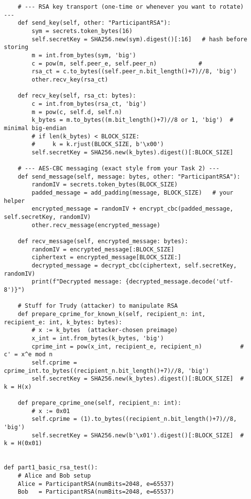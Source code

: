 \documentclass[11pt]{article}
\begin{document}
\begin{lstlisting}
    # --- RSA key transport (one-time or whenever you want to rotate) ---
    def send_key(self, other: "ParticipantRSA"):
        sym = secrets.token_bytes(16)
        self.secretKey = SHA256.new(sym).digest()[:16]   # hash before storing
        m = int.from_bytes(sym, 'big')
        c = pow(m, self.peer_e, self.peer_n)            #
        rsa_ct = c.to_bytes((self.peer_n.bit_length()+7)//8, 'big')
        other.recv_key(rsa_ct)

    def recv_key(self, rsa_ct: bytes):
        c = int.from_bytes(rsa_ct, 'big')
        m = pow(c, self.d, self.n)
        k_bytes = m.to_bytes((m.bit_length()+7)//8 or 1, 'big')  # minimal big-endian
        # if len(k_bytes) < BLOCK_SIZE:
        #     k = k.rjust(BLOCK_SIZE, b'\x00')
        self.secretKey = SHA256.new(k_bytes).digest()[:BLOCK_SIZE] 

    # --- AES-CBC messaging (exact style from your Task 2) ---
    def send_message(self, message: bytes, other: "ParticipantRSA"):
        randomIV = secrets.token_bytes(BLOCK_SIZE)
        padded_message = add_padding(message, BLOCK_SIZE)   # your helper
        encrypted_message = randomIV + encrypt_cbc(padded_message, self.secretKey, randomIV)
        other.recv_message(encrypted_message)

    def recv_message(self, encrypted_message: bytes):
        randomIV = encrypted_message[:BLOCK_SIZE]
        ciphertext = encrypted_message[BLOCK_SIZE:]
        decrypted_message = decrypt_cbc(ciphertext, self.secretKey, randomIV)
        print(f"Decrypted message: {decrypted_message.decode('utf-8')}")

    # Stuff for Trudy (attacker) to manipulate RSA
    def prepare_cprime_for_known_k(self, recipient_n: int, recipient_e: int, k_bytes: bytes):
        # x := k_bytes  (attacker-chosen preimage)
        x_int = int.from_bytes(k_bytes, 'big')
        cprime_int = pow(x_int, recipient_e, recipient_n)           # c' = x^e mod n
        self.cprime = cprime_int.to_bytes((recipient_n.bit_length()+7)//8, 'big')
        self.secretKey = SHA256.new(k_bytes).digest()[:BLOCK_SIZE]  # k = H(x)

    def prepare_cprime_one(self, recipient_n: int):
        # x := 0x01
        self.cprime = (1).to_bytes((recipient_n.bit_length()+7)//8, 'big')
        self.secretKey = SHA256.new(b'\x01').digest()[:BLOCK_SIZE]  # k = H(0x01)
    

def part1_basic_rsa_test():
    # Alice and Bob setup
    Alice = ParticipantRSA(numBits=2048, e=65537)
    Bob   = ParticipantRSA(numBits=2048, e=65537)


\end{lstlisting}
\end{document}
